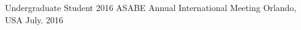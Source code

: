 
\begin{cvhonors}
\cvhonor
{Undergraduate Student} %
{2016 ASABE Annual International Meeting} %
{Orlando, USA} %
{July. 2016} %
\end{cvhonors}